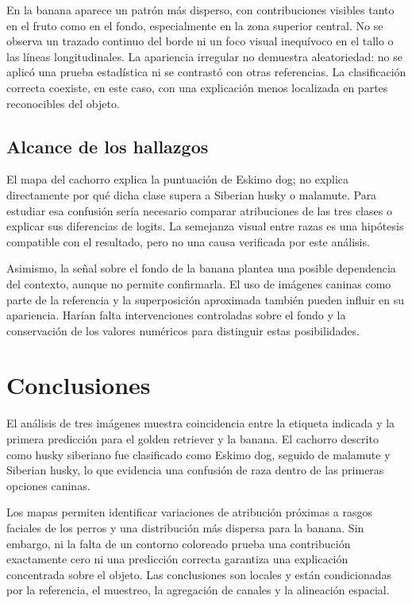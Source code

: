 \documentclass[10pt,a4paper,twocolumn]{article}
\begin{document}
En la banana aparece un patrón más disperso, con contribuciones visibles tanto en el fruto como en el fondo, especialmente en la zona superior central. No se observa un trazado continuo del borde ni un foco visual inequívoco en el tallo o las líneas longitudinales. La apariencia irregular no demuestra aleatoriedad: no se aplicó una prueba estadística ni se contrastó con otras referencias. La clasificación correcta coexiste, en este caso, con una explicación menos localizada en partes reconocibles del objeto.

\subsection{Alcance de los hallazgos}
El mapa del cachorro explica la puntuación de Eskimo dog; no explica directamente por qué dicha clase supera a Siberian husky o malamute. Para estudiar esa confusión sería necesario comparar atribuciones de las tres clases o explicar sus diferencias de logits. La semejanza visual entre razas es una hipótesis compatible con el resultado, pero no una causa verificada por este análisis.

Asimismo, la señal sobre el fondo de la banana plantea una posible dependencia del contexto, aunque no permite confirmarla. El uso de imágenes caninas como parte de la referencia y la superposición aproximada también pueden influir en su apariencia. Harían falta intervenciones controladas sobre el fondo y la conservación de los valores numéricos para distinguir estas posibilidades.

\section{Conclusiones}
El análisis de tres imágenes muestra coincidencia entre la etiqueta indicada y la primera predicción para el golden retriever y la banana. El cachorro descrito como husky siberiano fue clasificado como Eskimo dog, seguido de malamute y Siberian husky, lo que evidencia una confusión de raza dentro de las primeras opciones caninas.

Los mapas permiten identificar variaciones de atribución próximas a rasgos faciales de los perros y una distribución más dispersa para la banana. Sin embargo, ni la falta de un contorno coloreado prueba una contribución exactamente cero ni una predicción correcta garantiza una explicación concentrada sobre el objeto. Las conclusiones son locales y están condicionadas por la referencia, el muestreo, la agregación de canales y la alineación espacial.
\end{document}
